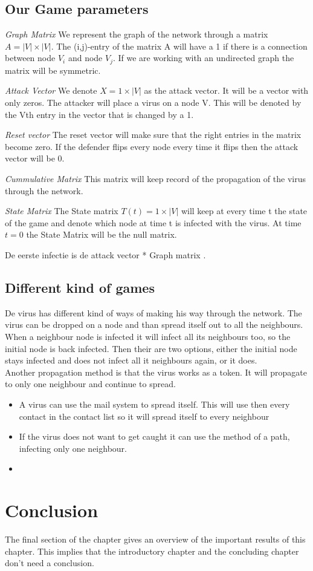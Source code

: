 \begin{description}
\subsection{Our Game parameters}
\begin{description}
\item \textit{Graph Matrix} We represent the graph of the network through a matrix $ A = |V| \times |V|$. The (i,j)-entry of the matrix A will have a 1 if there is a connection between node $V_{i}$ and node $V_{j}$. If we are working with an undirected graph the matrix will be symmetric. 
\item \textit{Attack Vector} We denote $X = 1 \times |V|$ as the attack vector. It will be a vector with only zeros. The attacker will place a virus on a node V. This will be denoted by the Vth entry in the vector that is changed by a 1.
\item \textit{Reset vector} The reset vector will make sure that the right entries in the matrix become zero. If the defender flips every node every time it flips then the attack vector will be 0.
\item \textit{Cummulative Matrix} This matrix will keep record of the propagation of the virus through the network.
\item \textit{State Matrix} The State matrix $T(t) = 1 \times |V| $ will keep at every time t the state of the game and denote which node at time t is infected with the virus. At time $t=0$ the State Matrix will be the null matrix.
\end{description}
De eerste infectie is de attack vector * Graph matrix . 
\end{description}

\subsection{Different kind of games}
De virus has different kind of ways of making his way through the network. The virus can be dropped on a node and than spread itself out to all the neighbours. When a neighbour node is infected it will infect all its neighbours too, so the initial node is back infected. Then their are two options, either the initial node stays infected and does not infect all it neighbours again, or it does. \\
Another propagation method is that the virus works as a token. It will propagate to only one neighbour and continue to spread. 
\begin{itemize}
\item A virus can use the mail system to spread itself. This will use then every contact in the contact list so it will spread itself to every neighbour
\item If the virus does not want to get caught it can use the method of a path, infecting only one neighbour.
\item 
\end{itemize}
\section{Conclusion}
The final section of the chapter gives an overview of the important results
of this chapter. This implies that the introductory chapter and the
concluding chapter don't need a conclusion.



